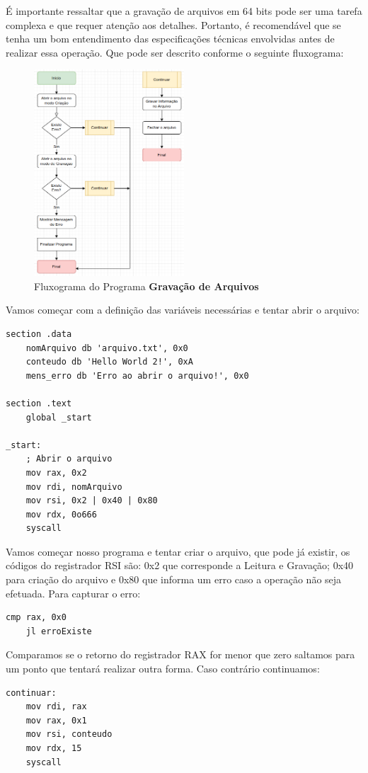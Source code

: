 É importante ressaltar que a gravação de arquivos em 64 bits pode ser uma tarefa complexa e que requer atenção aos detalhes. Portanto, é recomendável que se tenha um bom entendimento das especificações técnicas envolvidas antes de realizar essa operação. Que pode ser descrito conforme o seguinte fluxograma:
\begin{figure}[H]
	\centering
	\includegraphics[width=0.5\textwidth]{Pictures/cap05/programa54}
	\caption{Fluxograma do Programa \textbf{Gravação de Arquivos}}
\end{figure}

Vamos começar com a definição das variáveis necessárias e tentar abrir o arquivo:
\begin{lstlisting}[]
section .data
    nomArquivo db 'arquivo.txt', 0x0
    conteudo db 'Hello World 2!', 0xA
    mens_erro db 'Erro ao abrir o arquivo!', 0x0

section .text
    global _start

_start:
    ; Abrir o arquivo
    mov rax, 0x2  
    mov rdi, nomArquivo
    mov rsi, 0x2 | 0x40 | 0x80 
    mov rdx, 0o666
    syscall
\end{lstlisting}

Vamos começar nosso programa e tentar criar o arquivo, que pode já existir, os códigos do registrador RSI são: 0x2 que corresponde a Leitura e Gravação; 0x40 para criação do arquivo e 0x80 que informa um erro caso a operação não seja efetuada. Para capturar o erro:
\begin{lstlisting}[]
    cmp rax, 0x0
    jl erroExiste
\end{lstlisting}

Comparamos se o retorno do registrador RAX for menor que zero saltamos para um ponto que tentará realizar outra forma. Caso contrário continuamos:
\begin{lstlisting}[]
continuar:
    mov rdi, rax
    mov rax, 0x1
    mov rsi, conteudo
    mov rdx, 15
    syscall
\end{lstlisting}

